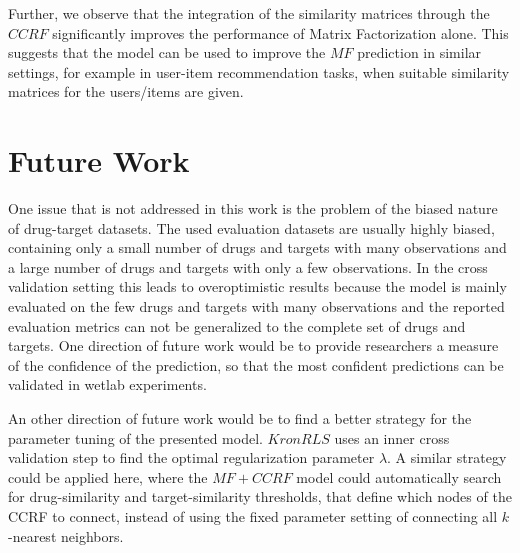 Further, we observe that the integration of the similarity matrices through the $CCRF$ significantly improves the performance of Matrix Factorization alone. This suggests that the model can be used to improve the $MF$ prediction in similar settings, for example in user-item recommendation tasks, when suitable similarity matrices for the users/items are given.


\section{Future Work}
One issue that is not addressed in this work is the problem of the biased nature of drug-target datasets. The used evaluation datasets are usually highly biased, containing only a small number of drugs and targets with many observations and a large number of drugs and targets with only a few observations. In the cross validation setting this leads to overoptimistic results because the model is mainly evaluated on the few drugs and targets with many observations and the reported evaluation metrics can not be generalized to the complete set of drugs and targets. One direction of future work would be to provide researchers a measure of the confidence of the prediction, so that the most confident predictions can be validated in wetlab experiments.

An other direction of future work would be to find a better strategy for the parameter tuning of the presented model. $KronRLS$ uses an inner cross validation step to find the optimal regularization parameter $\lambda$. A similar strategy could be applied here, where the $MF+CCRF$ model could automatically search for drug-similarity and target-similarity thresholds, that define which nodes of the CCRF to connect, instead of using the fixed parameter setting of connecting all $k$-nearest neighbors.

